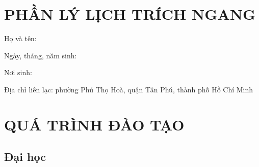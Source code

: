 \section*{PHẦN LÝ LỊCH TRÍCH NGANG}
Họ và tên: 

Ngày, tháng, năm sinh: 

Nơi sinh: 

Địa chỉ liên lạc: phường Phú Thọ Hoà, quận Tân Phú, thành phố Hồ Chí Minh
\section*{QUÁ TRÌNH ĐÀO TẠO}
\subsection*{Đại học}

